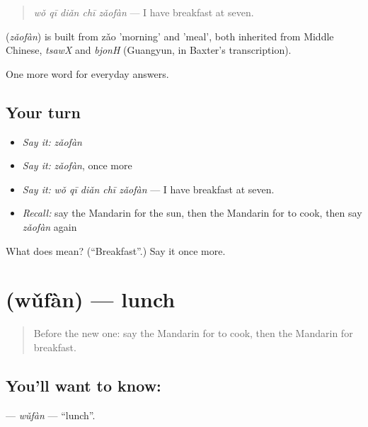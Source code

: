 \begin{quote}
\textbf{} \emph{wǒ qī diǎn chī zǎofàn} — I have breakfast at seven.
\end{quote}

\begin{cousinweb}
\textbf{} (\emph{zǎofàn}) is built from zǎo 'morning' and  'meal', both inherited from Middle Chinese, \emph{tsawX} and \emph{bjonH} (Guangyun, in Baxter's transcription).
\end{cousinweb}

\begin{grammarlens}[title={What you've built}]
One more word for everyday answers.
\end{grammarlens}

\subsection*{Your turn}
\begin{itemize}
\raggedright
  \item \emph{Say it:} \emph{zǎofàn}
  \item \emph{Say it:} \emph{zǎofàn}, once more
  \item \emph{Say it:} \emph{wǒ qī diǎn chī zǎofàn} — I have breakfast at seven.
  \item \emph{Recall:} say the Mandarin for the sun, then the Mandarin for to cook, then say \emph{zǎofàn} again
\end{itemize}

\begin{tcolorbox}[breakable,colback=teal!4,colframe=teal!35!black,title={Before you move on}]
What does  mean? (\textquotedblleft{}Breakfast\textquotedblright{}.) Say it once more.
\end{tcolorbox}
\section[\texorpdfstring{\zh{午饭} (wǔfàn)}{午饭 (wǔfàn)}]{ (wǔfàn) — lunch}

\label{lesson:ZH-C69-wufan}



\begin{quote}
Before the new one: say the Mandarin for to cook, then the Mandarin for breakfast.
\end{quote}

\subsection*{You'll want to know: }
\textbf{} — \emph{wǔfàn} — \textquotedblleft{}lunch\textquotedblright{}.

